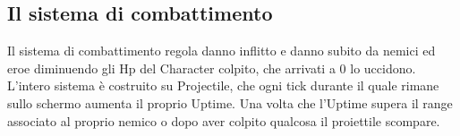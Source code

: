 \documentclass[12pt]{article}
\begin{document}
\subsection{Il sistema di combattimento}
Il sistema di combattimento regola danno inflitto e danno subito da nemici ed eroe diminuendo gli Hp del Character 
colpito, che arrivati a 0 lo uccidono. 
L'intero sistema è costruito su Projectile, che ogni tick durante il quale rimane sullo schermo aumenta il proprio Uptime.
Una volta che l'Uptime supera il range associato al proprio nemico o dopo aver colpito qualcosa il proiettile scompare.
\end{document}
